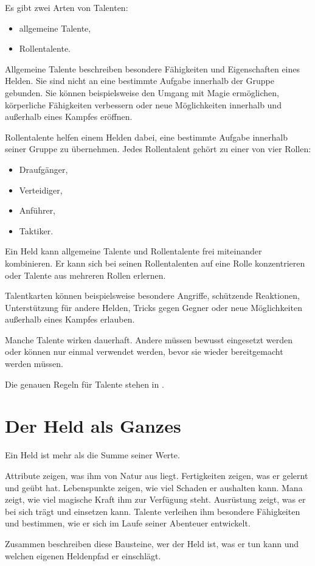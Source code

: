 Es gibt zwei Arten von Talenten:

\begin{itemize}
\item allgemeine Talente,
\item Rollentalente.
\end{itemize}

Allgemeine Talente beschreiben besondere Fähigkeiten und Eigenschaften eines Helden. Sie sind nicht an eine bestimmte Aufgabe innerhalb der Gruppe gebunden. Sie können beispielsweise den Umgang mit Magie ermöglichen, körperliche Fähigkeiten verbessern oder neue Möglichkeiten innerhalb und außerhalb eines Kampfes eröffnen.

Rollentalente helfen einem Helden dabei, eine bestimmte Aufgabe innerhalb seiner Gruppe zu übernehmen. Jedes Rollentalent gehört zu einer von vier Rollen:

\begin{itemize}
\item Draufgänger,
\item Verteidiger,
\item Anführer,
\item Taktiker.
\end{itemize}

Ein Held kann allgemeine Talente und Rollentalente frei miteinander kombinieren. Er kann sich bei seinen Rollentalenten auf eine Rolle konzentrieren oder Talente aus mehreren Rollen erlernen.

Talentkarten können beispielsweise besondere Angriffe, schützende Reaktionen, Unterstützung für andere Helden, Tricks gegen Gegner oder neue Möglichkeiten außerhalb eines Kampfes erlauben.

Manche Talente wirken dauerhaft. Andere müssen bewusst eingesetzt werden oder können nur einmal verwendet werden, bevor sie wieder bereitgemacht werden müssen.

Die genauen Regeln für Talente stehen in .

\section{Der Held als Ganzes}

Ein Held ist mehr als die Summe seiner Werte.

Attribute zeigen, was ihm von Natur aus liegt. Fertigkeiten zeigen, was er gelernt und geübt hat. Lebenspunkte zeigen, wie viel Schaden er aushalten kann. Mana zeigt, wie viel magische Kraft ihm zur Verfügung steht. Ausrüstung zeigt, was er bei sich trägt und einsetzen kann. Talente verleihen ihm besondere Fähigkeiten und bestimmen, wie er sich im Laufe seiner Abenteuer entwickelt.

Zusammen beschreiben diese Bausteine, wer der Held ist, was er tun kann und welchen eigenen Heldenpfad er einschlägt.
